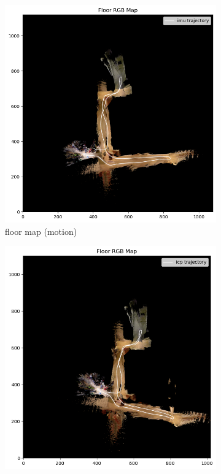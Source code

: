 \documentclass[conference]{IEEEtran}
\begin{document}
\begin{figure}[htbp]
    \begin{subfigure}{0.24\textwidth}
        \includegraphics[width=\linewidth]{../img/floormap_20_imu.png}
        \caption{floor map (motion)}
        \label{fig:floormap_20_imu}
    \end{subfigure}
    \hfill
    \begin{subfigure}{0.24\textwidth}
        \includegraphics[width=\linewidth]{../img/floormap_20_icp.png}

\end{subfigure}
\end{figure}
\end{document}
